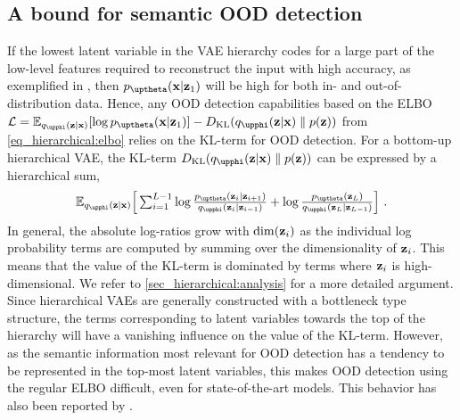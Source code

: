 {\subsection{A bound for semantic OOD detection}
If the lowest latent variable in the VAE hierarchy codes for a large part of the low-level features required to reconstruct the input with high accuracy, as exemplified in , then $p_\thetab(\xb|\zb_1)$ will be high for both in- and out-of-distribution data.
Hence, any OOD detection capabilities based on the ELBO $\mathcal{L} = \mathbb{E}_{q_\phib(\zb|\xb)}[\log p_\thetab(\xb|\zb_1)] - D_{\mathrm{KL}}( q_\phib(\zb|\xb) \parallel  p(\zb))$ from \cref{eq_hierarchical:elbo} relies on the KL-term for OOD detection. For a bottom-up hierarchical VAE, the KL-term $D_{\mathrm{KL}}( q_\phib(\zb|\xb) \parallel p(\zb))$ can be expressed by a hierarchical sum,%
\begin{equation}
    \mathbb{E}_{q_\phib(\zb|\xb)} \Big[ \textstyle\sum_{i=1}^{L-1} \log \frac{p_\thetab(\zb_i|\zb_{i+1})}{q_\phib(\zb_i|\zb_{i-1})} + \log \frac{p_\thetab(\zb_L)}{q_\phib(\zb_L|\zb_{L-1})} \Big] \ .
\end{equation}
In general, the absolute log-ratios grow with $\mathrm{dim}({\mathbf{z}}_i)$ as the individual log probability terms are computed by summing over the dimensionality of ${\mathbf{z}}_i$.
This means that the value of the KL-term is dominated by terms where ${\mathbf{z}}_i$ is high-dimensional. We refer to \cref{sec_hierarchical:analysis} for a more detailed argument.
Since hierarchical VAEs are generally constructed with a bottleneck type structure, the terms corresponding to latent variables towards the top of the hierarchy will have a vanishing influence on the value of the KL-term.
However, as the semantic information most relevant for OOD detection has a tendency to be represented in the top-most latent variables, this makes OOD detection using the regular ELBO difficult, even for state-of-the-art models.
This behavior has also been reported by \textcite{xiao_likelihood_2020}.

}
